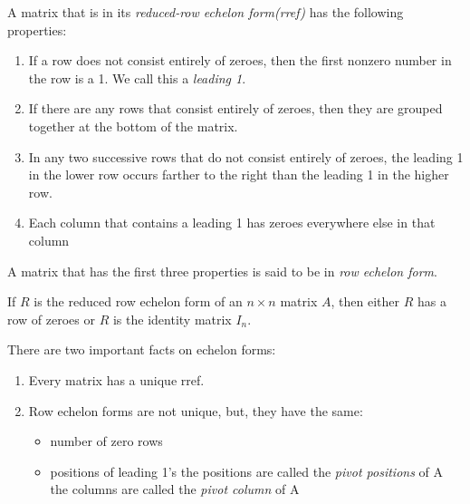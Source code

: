 \documentclass{report}
\begin{document}
		\begin{defn}
			A matrix that is in its \emph{reduced-row echelon form(rref)} has the following properties:
			\begin{enumerate}
				\item If a row does not consist entirely of zeroes, then the first nonzero number in the row is a 1. We call this a \emph{leading 1}.
				\item If there are any rows that consist entirely of zeroes, then they are grouped together at the bottom of the matrix.
				\item In any two successive rows that do not consist entirely of zeroes, the leading 1 in the lower row occurs farther to the right than the leading 1 in the higher row.
				\item Each column that contains a leading 1 has zeroes everywhere else in that column
			\end{enumerate}
			A matrix that has the first three properties is said to be in \emph{row echelon form}.
		\end{defn}
		
		\begin{thm}
			If $R$ is the reduced row echelon form of an $n \times n$ matrix $A$, then either $R$ has a row of zeroes or $R$ is the identity matrix $I_n$.
		\end{thm}
		
		There are two important facts on echelon forms:
		\begin{enumerate}
			\item Every matrix has a unique rref.
			\item Row echelon forms are not unique, but, they have the same:
			\begin{itemize}
				\item number of zero rows
				\item positions of leading 1's
					\subitem the positions are called the \emph{pivot positions} of A
					\subitem the columns are called the \emph{pivot column} of A
			\end{itemize}
		\end{enumerate}
		
\end{document}
